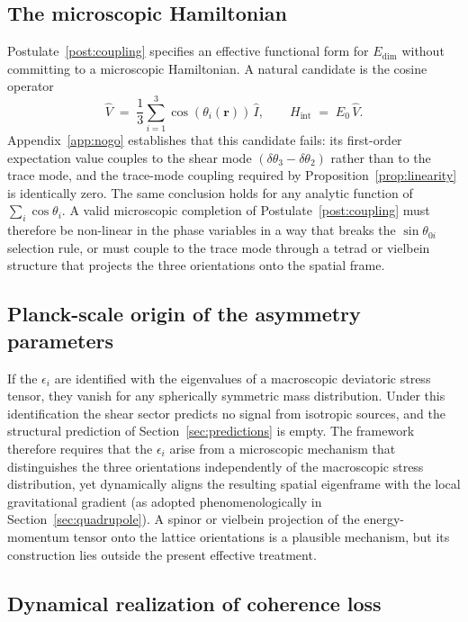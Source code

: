 \documentclass[pdflatex,sn-mathphys-num]{sn-jnl}%
\theoremstyle{thmstyleone}%
\theoremstyle{thmstyletwo}%
\theoremstyle{thmstylethree}%
\begin{document}
\subsection{The microscopic Hamiltonian}

Postulate~\ref{post:coupling} specifies an effective functional
form for $E_{\mathrm{dim}}$ without committing to a
microscopic Hamiltonian. A natural candidate is the cosine
operator
\begin{equation}
    \hat{V}
    \;=\;
    \frac{1}{3}\sum_{i=1}^{3}\cos(\theta_i(\mathbf{r}))\,\hat{I},
    \qquad
    H_{\mathrm{int}}\;=\;E_0\,\hat{V}.
    \label{eq:cosine_H}
\end{equation}
Appendix~\ref{app:nogo} establishes that this candidate fails:
its first-order expectation value couples to the shear mode
$(\delta\theta_3-\delta\theta_2)$ rather than to the trace
mode, and the trace-mode coupling required by
Proposition~\ref{prop:linearity} is identically zero. The
same conclusion holds for any analytic function of
$\sum_i\cos\theta_i$. A valid microscopic completion of
Postulate~\ref{post:coupling} must therefore be non-linear in
the phase variables in a way that breaks the $\sin\theta_{0i}$
selection rule, or must couple to the trace mode through a
tetrad or vielbein structure that projects the three
orientations onto the spatial frame.

\subsection{Planck-scale origin of the asymmetry parameters}

If the $\epsilon_i$ are identified with the eigenvalues of a
macroscopic deviatoric stress tensor, they vanish for any
spherically symmetric mass distribution. Under this
identification the shear sector predicts no signal from
isotropic sources, and the structural prediction of
Section~\ref{sec:predictions} is empty. The framework
therefore requires that the $\epsilon_i$ arise from a
microscopic mechanism that distinguishes the three
orientations independently of the macroscopic stress
distribution, yet dynamically aligns the resulting spatial 
eigenframe with the local gravitational gradient (as adopted 
phenomenologically in Section~\ref{sec:quadrupole}). A spinor 
or vielbein projection of the energy-momentum tensor onto the 
lattice orientations is a plausible mechanism, but its 
construction lies outside the present effective treatment.

\subsection{Dynamical realization of coherence loss}
\end{document}
